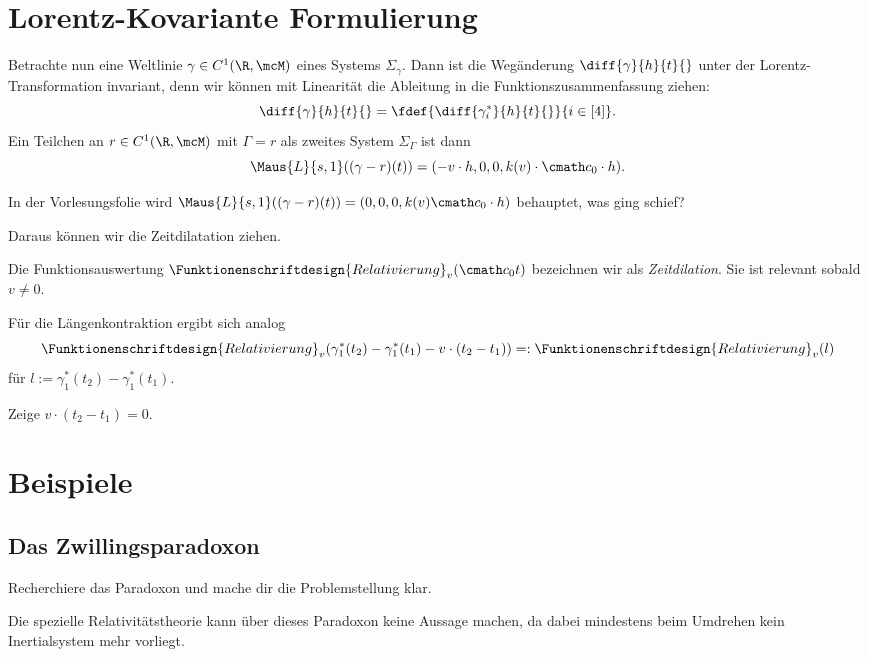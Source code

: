\documentclass[../WiSe22ANA3.tex]{subfiles}
\begin{document}
		\section{Lorentz-Kovariante Formulierung}
			Betrachte nun eine Weltlinie $\gamma\in C^1(\R,\mcM)$ eines Systems $\Sigma_\gamma$. Dann ist die Wegänderung $\diff{\gamma}{h}{t}{}$ unter der Lorentz-Transformation invariant, denn wir können mit Linearität die Ableitung in die Funktionszusammenfassung ziehen:
			$$\diff{\gamma}{h}{t}{}=\fdef{\diff{\gamma_i^*}{h}{t}{}}{i\in[4]}.$$
			Ein Teilchen an $r\in C^1(\R,\mcM)$ mit $\Gamma=r$ als zweites System $\Sigma_\Gamma$ ist dann 
			$$\Maus{L}{s,1}((\gamma-r)(t))=(-v\cdot h,0,0,k(v)\cdot\cmath c_0\cdot h).$$
			\begin{Aufgabe}
				\nr In der Vorlesungsfolie wird $\Maus{L}{s,1}((\gamma-r)(t))=(0,0,0,k(v)\cmath c_0\cdot h)$ behauptet, was ging schief? 
			\end{Aufgabe}
			Daraus können wir die Zeitdilatation ziehen.
			\begin{info}[Zeitdilatation]
				Die Funktionsauswertung $\Funktionenschriftdesign{Relativierung}_v(\cmath c_0t)$ bezeichnen wir als \emph{Zeitdilation}. Sie ist relevant sobald $v\neq 0$. 
			\end{info}
			Für die Längenkontraktion ergibt sich analog
			$$\Funktionenschriftdesign{Relativierung}_v(\gamma_1^*(t_2)-\gamma_1^*(t_1)-v\cdot (t_2-t_1))=:\Funktionenschriftdesign{Relativierung}_v(l)$$
			für $l:=\gamma_1^*(t_2)-\gamma_1^*(t_1)$. 
			\begin{Aufgabe}
				\nr Zeige $v\cdot (t_2-t_1)=0$. 
			\end{Aufgabe}
		
		\section{Beispiele}
			
			
			\subsection{Das Zwillingsparadoxon}	
				\begin{Aufgabe}
					\nr Recherchiere das Paradoxon und mache dir die Problemstellung klar. 
				\end{Aufgabe}
				Die spezielle Relativitätstheorie kann über dieses Paradoxon keine Aussage machen, da dabei mindestens beim Umdrehen kein Inertialsystem mehr vorliegt. 
				
			
\end{document}
